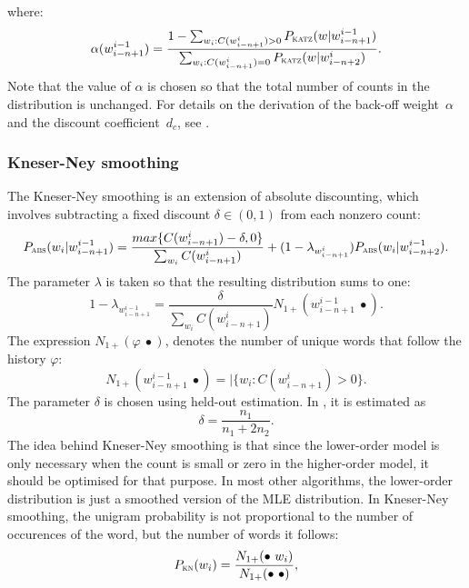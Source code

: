 	where:
        \begin{equation}
            \alpha(w_{i-n+1}^{i-1})=\frac{1-\sum_{w_{i}:C(w_{i-n+1}^{i})>0}P_{\textsc{katz}}(w|w_{i-n+1}^{i-1})}{\sum_{w_{i}:C(w_{i-n+1}^{i})=0}P_{\textsc{katz}}(w|w_{i-n+2}^{i})}.
        \end{equation}
        Note that the value of $\alpha$ is chosen so that the total number of counts in the distribution is unchanged. For details on the derivation of the back-off weight~$\alpha$ and the discount coefficient~$d_{c}$, see \cite{chen1996empirical}.
	\subsubsection*{Kneser-Ney smoothing}
	The Kneser-Ney smoothing is an extension of absolute discounting, which involves subtracting a fixed discount $\delta \in (0, 1)$ from each nonzero count:
	\begin{equation}
		P_{\textsc{abs}}(w_{i}|w_{i-n+1}^{i-1})= \frac{max\{C(w_{i-n+1}^{i})-\delta, 0\}}{\sum_{w_{i}}C(w_{i-n+1}^{i})}+(1-\lambda_{w_{i-n+1}^{i}})P_{\textsc{abs}}(w_{i}|w_{i-n+2}^{i-1}).
	\end{equation}
	The parameter $\lambda$ is taken so that the resulting distribution sums to one:
	\begin{equation}
		1-\lambda_{w_{i-n+1}^{i-1}}=\frac{\delta}{\sum_{w_{i}}C(w_{i-n+1}^{i})}N_{1+}(w_{i-n+1}^{i-1}~\bullet).
	\end{equation}
	The expression $N_{1+}(\varphi~\bullet)$, denotes the number of unique words that follow the history $\varphi$:
	\begin{equation}
		N_{1+}(w_{i-n+1}^{i-1}~\bullet)=|\{w_{i}:C(w_{i-n+1}^{i}) > 0\}.
	\end{equation}
	The parameter $\delta$ is chosen using held-out estimation. In \cite{ney1994structuring}, it is estimated as 
	\begin{equation}
		\delta=\frac{n_{1}}{n_{1}+2n_{2}}.
	\end{equation}
	The idea behind Kneser-Ney smoothing is that since the lower-order model is only necessary when the count is small or zero in the higher-order model, it should be optimised for that purpose. In most other algorithms, the lower-order distribution is just a smoothed version of the MLE distribution. In Kneser-Ney smoothing, the unigram probability is not proportional to the number of occurences of the word, but the number of words it follows:
	\begin{equation}
		P_{\textsc{kn}}(w_{i})=\frac{N_{1+}(\bullet~w_{i})}{N_{1+}(\bullet~\bullet)},
		\label{equation:kneser-ney}
	\end{equation}
